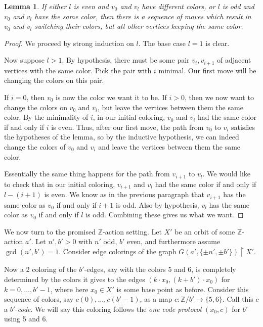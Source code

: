 \documentclass[10pt,a4paper]{article}
\newcommand{\0}{\varnothing}
\newcommand{\Z}{\mathbb{Z}}
\newcommand{\res}{\upharpoonright}
\newtheorem{lemma}{Lemma}
\begin{document}
\begin{lemma}\label{lem:game}
If either $l$ is even and $v_0$ and $v_l$ have different colors, or $l$ is odd and $v_0$ and $v_l$ have the same color, then there is a sequence of moves which result in $v_0$ and $v_l$ switching their colors, but all other vertices keeping the same color.
\end{lemma}

\begin{proof}
We proceed by strong induction on $l$. The base case $l=1$ is clear. 

Now suppose $l > 1$. By hypothesis, there must be some pair $v_i,v_{i+1}$ of adjacent vertices with the same color. Pick the pair with $i$ minimal. Our first move will be changing the colors on this pair.

If $i = 0$, then $v_0$ is now the color we want it to be. If $i > 0$, then we now want to change the colors on $v_0$ and $v_i$, but leave the vertices between them the same color. By the minimality of $i$, in our initial coloring, $v_0$ and $v_i$ had the same color if and only if $i$ is even. Thus, after our first move, the path from $v_0$ to $v_i$ satisfies the hypotheses of the lemma, so by the inductive hypothesis,  we can indeed change the colors of $v_0$ and $v_i$ and leave the vertices between them the same color.

Essentially the same thing happens for the path from $v_{i+1}$ to $v_l$. We would like to check that in our initial coloring, $v_{i+1}$ and $v_l$ had the same color if and only if $l - (i+1)$ is even. We know as in the previous paragraph that $v_{i+1}$ has the same color as $v_0$ if and only if $i+1$ is odd. Also by hypothesis, $v_l$ has the same color as $v_0$ if and only if $l$ is odd. Combining these gives us what we want.
\end{proof}

We now turn to the promised $\Z$-action setting. Let $X'$ be an orbit of some $\Z$-action $a'$. Let $n',b' > 0$ with $n'$ odd, $b'$ even, and furthermore assume $\gcd(n',b') = 1$. Consider edge colorings of the graph $G(a',\{\pm n', \pm b' \}) \res X'$. 

Now a 2 coloring of the $b'$-edges, say with the colors 5 and 6, is completely determined by the colors it gives to the edges $(k \cdot x_0, (k+b') \cdot x_0)$ for $k=0,\ldots,b'-1$, where here $x_0 \in X'$ is some base point as before. Consider this sequence of colors, say $c(0),\ldots,c(b'-1)$, as a map $c: \Z/b' \rightarrow \{5,6\}$. Call this $c$ a $b'$-\textit{code}. We will say this coloring follows the \textit{one code protocol} $(x_0,c)$ for $b'$ using 5 and 6. 
\end{document}
